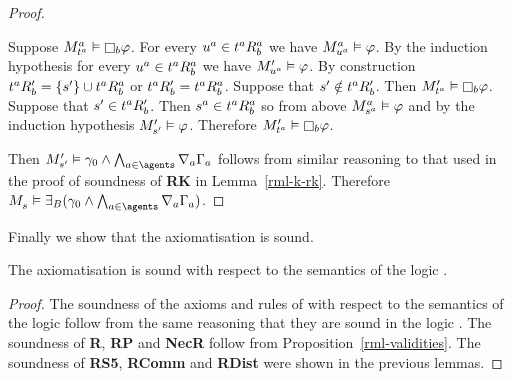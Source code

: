 \begin{proof}
\begin{enumerate}
\begin{description}
                Suppose $\kPModel[\agentA]{\kStateT[\agentA]} \entails \necessaryB \phi$.
                For every $\kStateU[\agentA] \in \kSuccessorsB[\agentA]{\kStateT[\agentA]}$ we have $\kPModel[\agentA]{\kStateU[\agentA]} \entails \phi$.
                By the induction hypothesis for every $\kStateU[\agentA] \in \kSuccessorsB[\agentA]{\kStateT[\agentA]}$ we have $\kPModelP{\kStateU[\agentA]} \entails \phi$.
                By construction $\kSuccessorsPB{\kStateT[\agentA]} = \{\kStateSP\} \cup \kSuccessorsB[\agentA]{\kStateT[\agentA]}$ or $\kSuccessorsPB{\kStateT[\agentA]} = \kSuccessorsB[\agentA]{\kStateT[\agentA]}$.
                Suppose that $\kStateSP \notin \kSuccessorsPB{\kStateT[\agentA]}$.
                Then $\kPModelP{\kStateT[\agentA]} \entails \necessaryB \phi$.
                Suppose that $\kStateSP \in \kSuccessorsPB{\kStateT[\agentA]}$.
                Then $\kStateS[\agentA] \in \kSuccessorsB[\agentA]{\kStateT[\agentA]}$ so from above $\kPModel[\agentA]{\kStateS[\agentA]} \entails \phi$ and by the induction hypothesis $\kPModelP{\kStateSP} \entails \phi$.
                Therefore $\kPModelP{\kStateT[\agentA]} \entails \necessaryB \phi$.
        \end{description}
\end{enumerate}

Then $\kPModelP{\kStateSP} \entails \gamma_0 \land \bigwedge_{\agentA \in \agents} \coversA \Gamma_\agentA$ follows from similar reasoning to that used in the proof of soundness of {\bf RK} in Lemma~\ref{rml-k-rk}.
Therefore $\kPModel{\kStateS} \entails \somerefsBs (\gamma_0 \land \bigwedge_{\agentA \in \agents} \coversA \Gamma_\agentA)$.
\end{proof}

Finally we show that the axiomatisation \axiomRmlS{} is sound.

\begin{lemma}\label{rml-s5-sound}
The axiomatisation \axiomRmlS{} is sound with respect to the semantics of the logic \logicRmlS{}.
\end{lemma}

\begin{proof}
The soundness of the axioms and rules of \axiomS{} with respect to the semantics of the logic \logicRmlS{} follow from the same reasoning that they are sound in the logic \logicS{}.
The soundness of {\bf R}, {\bf RP} and {\bf NecR} follow from Proposition~\ref{rml-validities}.
The soundness of {\bf RS5}, {\bf RComm} and {\bf RDist} were shown in the previous lemmas.
\end{proof}

